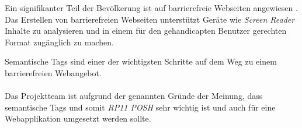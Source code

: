 Ein signifikanter Teil der Bevölkerung ist auf barrierefreie Webseiten angewiesen \cite{BarrierefreiesInternet}. Das Erstellen von barrierefreien Webseiten unterstützt Geräte wie \emph{Screen Reader} Inhalte zu analysieren und in einem für den gehandicapten Benutzer gerechten Format zugänglich zu machen.

Semantische Tags sind einer der wichtigsten Schritte auf dem Weg zu einem barrierefreien Webangebot.
\\ \\
Das Projektteam ist aufgrund der genannten Gründe der Meinung, dass semantische Tags und somit \emph{RP11 POSH} sehr wichtig ist und auch für eine Webapplikation umgesetzt werden sollte.